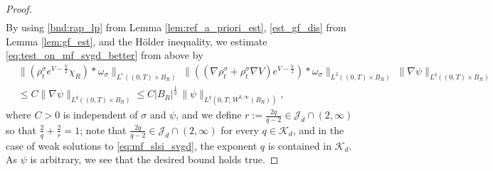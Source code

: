 \documentclass[reqno, 11pt]{amsart}
\numberwithin{equation}{section}
\theoremstyle{definition}
\begin{document}
\begin{proof}
\begin{align}
    \end{align}
    By using \ref{bnd:rap_lp} from Lemma \ref{lem:ref_a_priori_est}, \ref{est_gf_dis} from Lemma \ref{lem:gf_est}, and the H\"older inequality, we estimate \eqref{eq:test_on_mf_svgd_better} from above by
    \begin{align*}
        &\|(\rho_t^\sigma e^{V-\frac{\mathbb{V}}{2}}\chi_R)\ast\omega_\sigma\|_{L^r((0,T)\times B_R)}\;
        \|((\nabla \rho_t^\sigma+\rho_t^\sigma \nabla V)e^{V-\frac{\mathbb{V}}{2}}) \ast\omega_\sigma\|_{L^2((0,T)\times B_R)}\;
        \|\nabla\psi\|_{L^q((0,T)\times B_R)}\\
        &\leq C\|\nabla\psi\|_{L^q((0,T)\times B_R)}
        \leq C|B_R|^{\frac{1}{q}}\,\|\psi\|_{L^q(0,T;\, W^{k,\infty}(B_R))},
    \end{align*}
    where $C>0$ is independent of $\sigma$ and $\psi$, and we define $r := \frac{2q}{q-2} \in \mathcal{J}_d \cap (2,\infty)$ so that $\frac{2}{q} + \frac{2}{r} = 1$; note that $\frac{2q}{q-2} \in \mathcal{J}_d \cap (2,\infty)$ for every $q \in \mathcal{K}_d$, and in the case of weak solutions to \eqref{eq:mf_slsi_svgd}, the exponent $q$ is contained in $\mathcal{K}_d$. As $\psi$ is arbitrary, we see that the desired bound holds true.
\end{proof}
\end{document}

